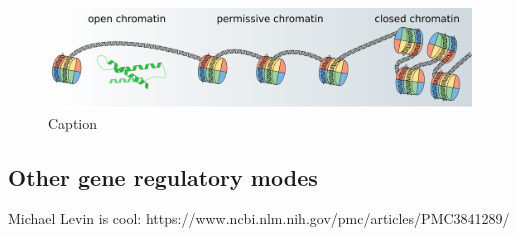 \begin{figure}[H]
    \includegraphics[width=\linewidth]{ch.introduction/imgs/accessibility_horizontal.png}
    \caption{Caption}
    \label{fig:accessibility}
\end{figure}


\subsection{Other gene regulatory modes}
 Michael Levin is cool: https://www.ncbi.nlm.nih.gov/pmc/articles/PMC3841289/

